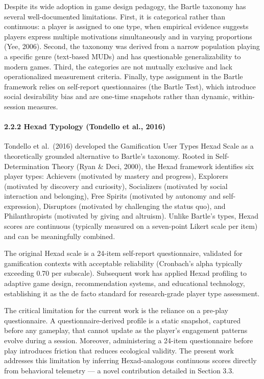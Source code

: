 Despite its wide adoption in game design pedagogy, the Bartle taxonomy
has several well-documented limitations. First, it is categorical rather
than continuous: a player is assigned to one type, when empirical
evidence suggests players express multiple motivations simultaneously
and in varying proportions (Yee, 2006). Second, the taxonomy was derived
from a narrow population playing a specific genre (text-based MUDs) and
has questionable generalizability to modern games. Third, the categories
are not mutually exclusive and lack operationalized measurement
criteria. Finally, type assignment in the Bartle framework relies on
self-report questionnaires (the Bartle Test), which introduce social
desirability bias and are one-time snapshots rather than dynamic,
within-session measures.

\paragraph{2.2.2 Hexad Typology (Tondello et al.,
2016)}\label{hexad-typology-tondello-et-al.-2016}

Tondello et al.~(2016) developed the Gamification User Types Hexad Scale
as a theoretically grounded alternative to Bartle's taxonomy. Rooted in
Self-Determination Theory (Ryan \& Deci, 2000), the Hexad framework
identifies six player types: Achievers (motivated by mastery and
progress), Explorers (motivated by discovery and curiosity), Socializers
(motivated by social interaction and belonging), Free Spirits (motivated
by autonomy and self-expression), Disruptors (motivated by challenging
the status quo), and Philanthropists (motivated by giving and altruism).
Unlike Bartle's types, Hexad scores are continuous (typically measured
on a seven-point Likert scale per item) and can be meaningfully
combined.

The original Hexad scale is a 24-item self-report questionnaire,
validated for gamification contexts with acceptable reliability
(Cronbach's alpha typically exceeding 0.70 per subscale). Subsequent
work has applied Hexad profiling to adaptive game design, recommendation
systems, and educational technology, establishing it as the de facto
standard for research-grade player type assessment.

The critical limitation for the current work is the reliance on a
pre-play questionnaire. A questionnaire-derived profile is a static
snapshot, captured before any gameplay, that cannot update as the
player's engagement patterns evolve during a session. Moreover,
administering a 24-item questionnaire before play introduces friction
that reduces ecological validity. The present work addresses this
limitation by inferring Hexad-analogous continuous scores directly from
behavioral telemetry --- a novel contribution detailed in Section 3.3.

